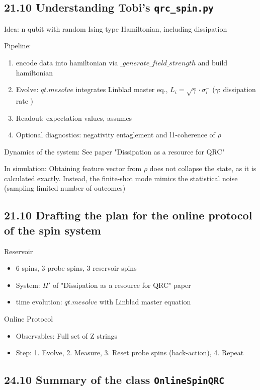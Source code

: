 \subsection*{21.10 \quad Understanding Tobi's \texttt{qrc\_spin.py}}
Idea:
n qubit with random Ising type Hamiltonian, including dissipation

Pipeline:
\begin{enumerate}
    \item encode data into hamiltonian via $\_generate\_field\_strength$ and build hamiltonian
    \item Evolve: $qt.mesolve$ integrates Linblad master eq., $L_i = \sqrt{\gamma} \cdot \sigma_i^- $ ($\gamma$: dissipation rate )
    \item Readout: expectation values, assumes
    \item Optional diagnostics: negativity entaglement and l1-coherence of $\rho$
\end{enumerate}

Dynamics of the system: See paper "Dissipation as a resource for QRC"

In simulation: Obtaining feature vector from $\rho$ does not collapse the state, as it is calculated exactly.
Instead, the finite-shot mode mimics the statistical noise (sampling limited number of outcomes)

\subsection*{21.10 \quad Drafting the plan for the online protocol of the spin system}
Reservoir
\begin{itemize}
    \item 6 spins, 3 probe spins, 3 reservoir spins
    \item System: $H'$ of "Dissipation as a resource for QRC" paper
    \item time evolution: $qt.mesolve$ with Linblad master equation
\end{itemize}

Online Protocol
\begin{itemize}
    \item Observables: Full set of Z strings
    \item Step: 1. Evolve, 2. Measure, 3. Reset probe spins (back-action), 4. Repeat
\end{itemize}

\subsection*{24.10 \quad Summary of the class \texttt{OnlineSpinQRC}}


